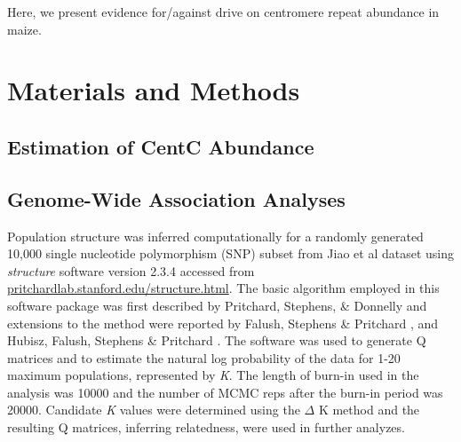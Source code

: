 \documentclass[12pt]{article}
\begin{document}

Here, we present evidence for/against drive on centromere repeat abundance in maize.     

\section{Materials and Methods}

\subsection{Estimation of CentC Abundance} %

\subsection{Genome-Wide Association Analyses} %
Population structure was inferred computationally for a randomly generated 10,000 single nucleotide polymorphism (SNP) subset from Jiao et al dataset using \emph{structure} software version 2.3.4 accessed from \url{pritchardlab.stanford.edu/structure.html}.  The basic algorithm employed in this software package was first described by Pritchard, Stephens, \& Donnelly \cite{Pritchard2000} and extensions to the method were reported by Falush, Stephens \& Pritchard \cite{Falush2003}, \cite{Falush2007} and Hubisz, Falush, Stephens \& Pritchard \cite{Hubisz2009}.  The software was used to generate Q matrices and to estimate the natural log probability of the data for 1-20 maximum populations, represented by \emph{K}.  The length of burn-in used in the analysis was 10000 and the number of MCMC reps after the burn-in period was 20000.  Candidate \emph{K} values were determined using the $\Delta$ K method and the resulting Q matrices, inferring relatedness, were used in further analyzes.    
\end{document}
